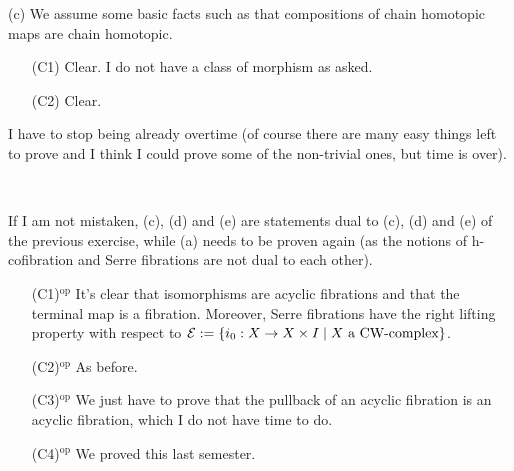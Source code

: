 \begin{exercise}[2]
(c) We assume some basic facts such as that compositions of chain homotopic maps are chain homotopic.

\begin{enumerate}
\item[(C1)]
Clear. I do not have a class of morphism as asked.

\item[(C2)]
Clear.

\end{enumerate}

I have to stop being already overtime (of course there are many easy things left to prove and I think I could prove some of the non-trivial ones, but time is over).

\end{exercise}

\begin{exercise}[3]\ 

If I am not mistaken, (c), (d) and (e) are statements dual to (c), (d) and (e) of the previous exercise, while (a) needs to be proven again (as the notions of h-cofibration and Serre fibrations are not dual to each other).

\begin{enumerate}

    \item[(C1)$^{\operatorname{op}}$] It's clear that isomorphisms are acyclic fibrations and that the terminal map is a fibration. Moreover, Serre fibrations have the right lifting property with respect to $\mathcal{E} := \{ i_0 : X \to X\times I\mid X\text{ a CW-complex} \}$.
    
    \item[(C2)$^{\operatorname{op}}$] As before.
    
    \item[(C3)$^{\operatorname{op}}$] We just have to prove that the pullback of an acyclic fibration is an acyclic fibration, which I do not have time to do.
    
    \item[(C4)$^{\operatorname{op}}$] We proved this last semester.

\end{enumerate}
\end{exercise}


